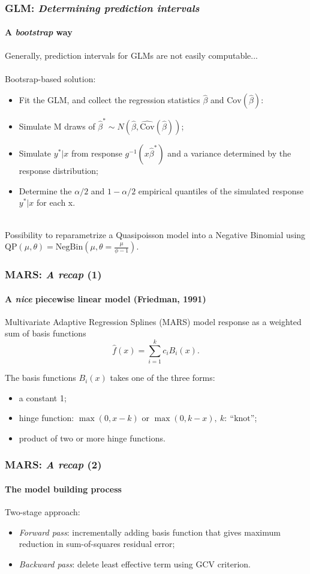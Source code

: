 \documentclass{beamer}
\begin{document}
{\begin{frame}[t]
	\frametitle{GLM: \textit{Determining prediction intervals}}
	\framesubtitle{A \textit{bootstrap} way }
	Generally, prediction intervals for GLMs are not easily computable...
	\\~\\
	Bootsrap-based solution:
	\begin{itemize}
		\item Fit the GLM, and collect the regression statistics $\hat{\beta}$ and $\text{Cov}(\hat{\beta})$:
		\item Simulate M draws of $\hat{\beta}^{*} \sim N(\hat{\beta}, \hat{\mathrm{Cov}}(\hat{\beta}))$;
		\item Simulate $y^*| x$ from response $g^{-1}(x \hat{\beta}^{*})$ and a variance determined by the response distribution;
		\item Determine the $\alpha/2$ and $1-\alpha/2$ empirical quantiles of the simulated response $y^*|x$ for each x.
	\end{itemize}
	~\\
	Possibility to reparametrize a Quasipoisson model into a Negative Binomial using $\mathrm{QP}(\mu, \theta) = \mathrm{NegBin}(\mu, \theta = \frac{\mu}{\phi - 1}).$
\end{frame}

\begin{frame}[t]
	\frametitle{MARS: \textit{A recap} (1)}
	\framesubtitle{A \textit{nice} piecewise linear model (Friedman, 1991)}

	Multivariate Adaptive Regression Splines (MARS) model response as a weighted sum of basis functions
	$$ \widehat{f}(x) = \sum_{i=1}^k c_i B_i(x). $$


	The basis functions $B_i(x)$ takes one of the three forms:

	\begin{itemize}
		\item a constant 1;
		\item hinge function:  $\max(0, x - k)$ or $\max(0, k - x), ~ k: \ \text{``knot''}$;
		\item product of two or more hinge functions.
	\end{itemize}


\end{frame}

\begin{frame}[t]
	\frametitle{MARS: \textit{A recap} (2)}
	\framesubtitle{The model building process}
	Two-stage approach:
	\begin{itemize}
		\item \textit{Forward pass}: incrementally adding basis function that gives maximum reduction in sum-of-squares residual error;
		\item \textit{Backward pass}: delete least effective term using GCV criterion.
	\end{itemize}


\end{frame}}
\end{document}
